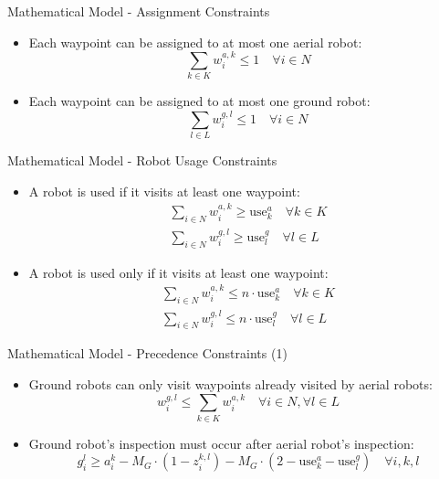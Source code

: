 \documentclass[aspectratio=169,11pt,xcolor={dvipsnames},hyperref={pdftex,pdfpagemode=UseNone,hidelinks,pdfdisplaydoctitle=true},usepdftitle=false]{beamer}
\begin{document}
  \begin{frame}{Mathematical Model - Assignment Constraints}
    \begin{itemize}
      \item Each waypoint can be assigned to at most one aerial robot:
      \begin{equation}
        \sum_{k \in K} w_i^{a,k} \leq 1 \quad \forall i \in N
      \end{equation}
      
      \item Each waypoint can be assigned to at most one ground robot:
      \begin{equation}
        \sum_{l \in L} w_i^{g,l} \leq 1 \quad \forall i \in N
      \end{equation}
    \end{itemize}
  \end{frame}

  \begin{frame}{Mathematical Model - Robot Usage Constraints}
    \begin{itemize}
      \item A robot is used if it visits at least one waypoint:
      \begin{align}
        \sum_{i \in N} w_i^{a,k} \geq \text{use}_k^a \quad \forall k \in K\\
        \sum_{i \in N} w_i^{g,l} \geq \text{use}_l^g \quad \forall l \in L
      \end{align}
      
      \item A robot is used only if it visits at least one waypoint:
      \begin{align}
        \sum_{i \in N} w_i^{a,k} \leq n \cdot \text{use}_k^a \quad \forall k \in K\\
        \sum_{i \in N} w_i^{g,l} \leq n \cdot \text{use}_l^g \quad \forall l \in L
      \end{align}
    \end{itemize}
  \end{frame}

  \begin{frame}{Mathematical Model - Precedence Constraints (1)}
    \begin{itemize}
      \item Ground robots can only visit waypoints already visited by aerial robots:
      \begin{equation}
        w_i^{g,l} \leq \sum_{k \in K} w_i^{a,k} \quad \forall i \in N, \forall l \in L
      \end{equation}
      
      \item Ground robot's inspection must occur after aerial robot's inspection:
      \begin{equation}
        g_i^l \geq a_i^k - M_G \cdot (1 - z_i^{k,l}) - M_G \cdot (2 - \text{use}_k^a - \text{use}_l^g) \quad \forall i, k, l
      \end{equation}
    \end{itemize}
  \end{frame}
\end{document}
